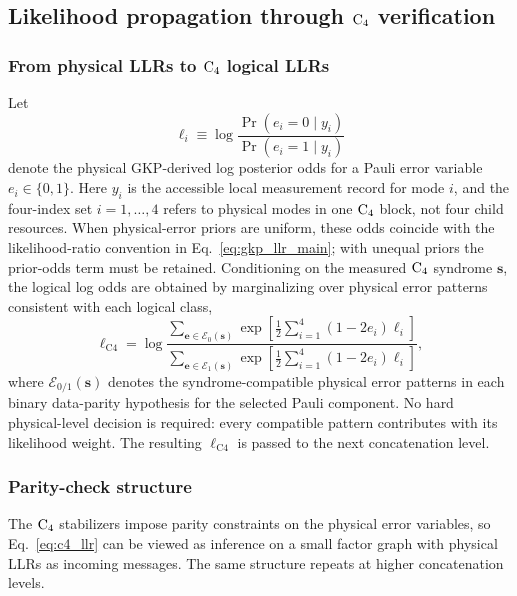 \documentclass[aps,
prx,
superscriptaddress,
reprint,
longbibliography,
floatfix]{revtex4-2}
\newcommand{\Cfour}{\mathrm{C4}}
\begin{document}
\subsection{Likelihood propagation through ${\rm C_4}$ verification}\label{sec:c4gkp}

\subsubsection{From physical LLRs to ${\rm C_4}$ logical LLRs}
\label{sec:physical_to_c4_llr}
Let
\begin{equation}
\ell_i \equiv \log \frac{\Pr(e_i=0\mid y_i)}{\Pr(e_i=1\mid y_i)}
\end{equation}
denote the physical GKP-derived log posterior odds for a Pauli error variable $e_i\in\{0,1\}$. Here $y_i$ is the accessible local measurement record for mode $i$, and the four-index set $i=1,\ldots,4$ refers to physical modes in one ${\rm C_4}$ block, not four child resources. When physical-error priors are uniform, these odds coincide with the likelihood-ratio convention in Eq.~\eqref{eq:gkp_llr_main}; with unequal priors the prior-odds term must be retained. Conditioning on the measured ${\rm C_4}$ syndrome $\bm s$, the logical log odds are obtained by marginalizing over physical error patterns consistent with each logical class,
\begin{equation}
\ell_{\Cfour}
=\log
\frac{\sum\limits_{\bm e\in\mathcal E_0(\bm s)}
\exp\!\left[\frac12\sum_{i=1}^{4}(1-2e_i)\ell_i\right]}
{\sum\limits_{\bm e\in\mathcal E_1(\bm s)}
\exp\!\left[\frac12\sum_{i=1}^{4}(1-2e_i)\ell_i\right]},
\label{eq:c4_llr}
\end{equation}
where $\mathcal E_{0/1}(\bm s)$ denotes the syndrome-compatible physical error patterns in each binary data-parity hypothesis for the selected Pauli component. No hard physical-level decision is required: every compatible pattern contributes with its likelihood weight. The resulting $\ell_{\Cfour}$ is passed to the next concatenation level.

\subsubsection{Parity-check structure}

The ${\rm C_4}$ stabilizers impose parity constraints on the physical error variables, so Eq.~\eqref{eq:c4_llr} can be viewed as inference on a small factor graph with physical LLRs as incoming messages. The same structure repeats at higher concatenation levels.
\end{document}
